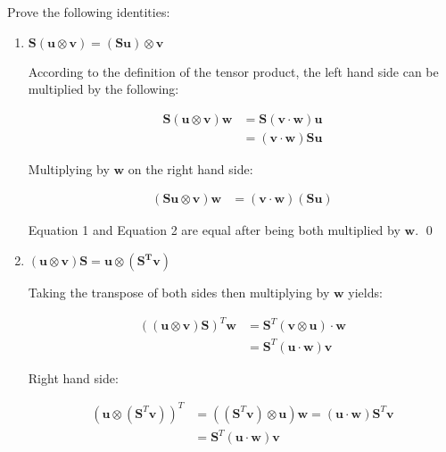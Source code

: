 \begin{problem} 
        \normalfont
        Prove the following identities:
    \begin{enumerate}

        \item $\mathbf{S}(\mathbf{u\otimes v})=(\mathbf{Su})\otimes \mathbf{v}$
        
        
\normalfont According to the definition of the tensor product, the left hand side can be multiplied by the following:

\begin{align*}
\mathbf{S}(\mathbf{u}\otimes \mathbf{v}) \mathbf{w}&=\mathbf{S(\mathbf{v}\cdot \mathbf{w})\mathbf{u}}\\[10pt]
&=(\mathbf{v}\cdot \mathbf{w})\mathbf{S}\mathbf{u}\tag{1}
\end{align*}

Multiplying by $\mathbf{w}$ on the right hand side:


\begin{align*}
(\mathbf{S}\mathbf{u}\otimes \mathbf{v})\mathbf{w}&=(\mathbf{v}\cdot \mathbf{w})(\mathbf{S}\mathbf{u})\tag{2}
\end{align*}


Equation 1 and Equation 2 are equal after being both multiplied by $\mathbf{w}$. \qed
\vspace*{1cm}
        \item $(\mathbf{u}\otimes \mathbf{v})\mathbf{S}=\mathbf{u}\otimes(\mathbf{S^T}\mathbf{v})$

        Taking the transpose of both sides then multiplying by $\mathbf{w}$ yields:
        
        
        \begin{align*}
        ((\mathbf{u}\otimes \mathbf{v})\mathbf{S})^T\mathbf{w}&=\mathbf{S}^T(\mathbf{v}\otimes \mathbf{u})\cdot \mathbf{w}\\[10pt]
        &=\mathbf{S}^T(\mathbf{u}\cdot \mathbf{w})\mathbf{v}
        \end{align*}
        
        
        Right hand side:
        
        
        \begin{align*}
        (\mathbf{u}\otimes (\mathbf{S}^T\mathbf{v}))^T&=((\mathbf{S}^T\mathbf{v})\otimes \mathbf{u})\mathbf{\mathbf{w}}=(\mathbf{u}\cdot \mathbf{w})\mathbf{S}^T\mathbf{v}\\[10pt]
        &=\mathbf{S}^T(\mathbf{u}\cdot \mathbf{w})\mathbf{v}
        \end{align*}
        

\end{enumerate}
\end{problem}
